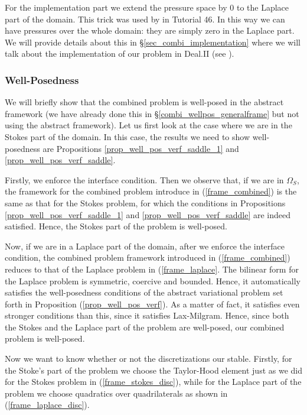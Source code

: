 \documentclass[12pt,a4paper]{article}
\theoremstyle{definition}
\begin{document}
 For the implementation part we extend the pressure space by $0$ to the Laplace part of the domain.  This trick was used by \cite{BangerthHartmannKanschat2007} in Tutorial 46.   In this way we can have pressures over the whole  domain: they are simply zero in the Laplace part.  We will provide details about this in \S \ref{sec_combi_implementation} where we will talk about the implementation of our problem in Deal.II (see \cite{BangerthHartmannKanschat2007}).
 \subsubsection{Well-Posedness}
 We will briefly show that the combined problem is well-posed in the abstract framework (we have already done this in \S \ref{combi_wellpos_generalframe} but not using the abstract framework).  Let us first look at the case where we are in the Stokes part of the domain.  In this case, the results we need to show well-posedness are Propositions \ref{prop_well_pos_verf_saddle_1} and \ref{prop_well_pos_verf_saddle}.  
 
 Firstly, we enforce the interface condition.  Then we observe that, if we are in $\Omega_S$, the framework for the combined problem introduce in (\ref{frame_combined}) is the same as that for the Stokes problem, for which the conditions in Propositions \ref{prop_well_pos_verf_saddle_1} and \ref{prop_well_pos_verf_saddle} are indeed satisfied.  Hence, the Stokes part of the problem is well-posed.
 
 Now, if we are in a Laplace part of the domain, after we enforce the interface condition, the combined problem framework introduced in (\ref{frame_combined}) reduces to that of the Laplace problem in (\ref{frame_laplace}.  The bilinear form for the Laplace problem is symmetric, coercive and bounded.  Hence, it automatically satisfies the well-posedness conditions of the abstract variational problem set forth in Proposition (\ref{prop_well_pos_verf}).  As a matter of fact, it satisfies even stronger conditions than this, since it satisfies Lax-Milgram. 
  Hence, since both the Stokes and the Laplace part of the problem are  well-posed, our combined problem is well-posed. 
 
  Now we want to know whether or not the discretizations our stable.  Firstly, for the Stoke's part of the problem we choose the Taylor-Hood element just as we did for the Stokes problem in (\ref{frame_stokes_disc}), while for the Laplace part of the problem we choose quadratics over quadrilaterals as shown in (\ref{frame_laplace_disc}).
  
\end{document}
